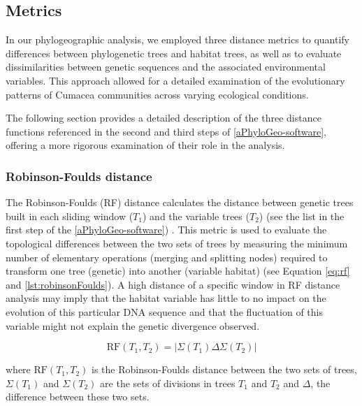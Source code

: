 \subsection{Metrics}\label{metrics}
In our phylogeographic analysis, we employed three distance metrics to quantify differences between phylogenetic trees and habitat trees, as well as to evaluate dissimilarities between genetic sequences and the associated environmental variables. This approach allowed for a detailed examination of the evolutionary patterns of Cumacea communities across varying ecological conditions.

The following section provides a detailed description of the three distance functions referenced in the second and third steps of \autoref{aPhyloGeo-software}, offering a more rigorous examination of their role in the analysis.

\subsubsection{Robinson-Foulds distance}\label{RF}
The Robinson-Foulds (RF) distance \citep{robinson_comparison_1981} calculates the distance between genetic trees built in each sliding window ($T_1$) and the variable trees ($T_2$) (see the list in the first step of the \autoref{aPhyloGeo-software}) \citep{tahiri2018new, li2024comparison}. This metric is used to evaluate the topological differences between the two sets of trees by measuring the minimum number of elementary operations (merging and splitting nodes) required to transform one tree (genetic) into another (variable habitat) (see Equation \eqref{eq:rf} and \autoref{lst:robinsonFoulds}). A high distance of a specific window in RF distance analysis may imply that the habitat variable has little to no impact on the evolution of this particular DNA sequence and that the fluctuation of this variable might not explain the genetic divergence observed.

\begin{equation}\label{eq:rf}
    \text{RF}(T_1, T_2) = | \Sigma(T_1) \Delta \Sigma(T_2) |
\end{equation}

where $\text{RF}(T_1, T_2)$ is the Robinson-Foulds distance between the two sets of trees, $\Sigma(T_1)$ and $\Sigma(T_2)$ are the sets of divisions in trees $T_1$ and $T_2$ and $ \Delta $, the difference between these two sets.

